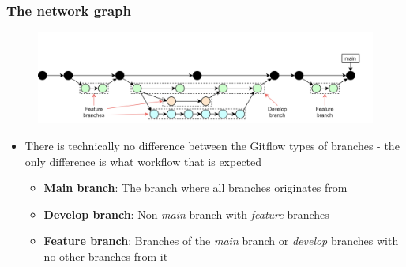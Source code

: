 \documentclass[aspectratio=169]{beamer} %
\begin{document}
\begin{frame}
	\frametitle{The network graph}

	\vspace{-.5cm}
	\begin{minipage}[t][5cm][t]{\textwidth}
		\begin{figure}
			\centering
			\includegraphics[width=\textwidth]{./img/dime-gitflow-network-names.png}
		\end{figure}
	\end{minipage}

	\vspace{-1cm}
	\begin{minipage}[t][5cm][t]{\textwidth}
		\begin{itemize}
			\setlength\itemsep{.4em}
			\item There is technically no difference between
			the Gitflow types of branches
			- the only difference is what workflow that is expected
			\begin{itemize}
				\setlength\itemsep{.5em}
				\item \textbf{Main branch}:
				The branch where all branches originates from
				\item \textbf{Develop branch}:
				Non-\textit{main} branch with \textit{feature} branches
				\item \textbf{Feature branch}:
				Branches of the \textit{main} branch or
				\textit{develop} branches with no other branches from it
			\end{itemize}
		\end{itemize}
	\end{minipage}
\end{frame}
\end{document}
